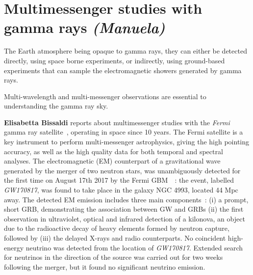 \documentclass{PoS}
\begin{document}
\section{Multimessenger studies with gamma rays {\it (Manuela)}}
The Earth atmosphere being opaque to gamma rays, they can either be  detected directly, using space borne experiments, or indirectly, using ground-based experiments that can sample the electromagnetic showers generated by gamma rays. %


Multi-wavelength and multi-messenger observations are 
essential to understanding the gamma ray sky.


{\bf Elisabetta Bissaldi} reports about multimessenger studies with the \textit{Fermi} gamma ray satellite~\cite{Bissaldi}, operating in space since 10 years. 
The Fermi satellite is a key instrument to perform multi-messenger astrophysics, giving the high pointing accuracy, as well as the high quality data for both temporal and spectral analyses. The  electromagnetic (EM) counterpart of a gravitational wave generated by the merger of two neutron stars, was unambiguously detected for the first time on August 17th 2017 by the Fermi GBM~\cite{Gold2017}~\cite{Abbott2017}: the event, labelled \textit{GW170817}, was found to take place in the galaxy NGC 4993, located 44 Mpc away. The detected EM emission includes three main components~\cite{TheMMpaper}: (i) a prompt, short GRB, demonstrating the association between GW and GRBs (ii) the first observation in ultraviolet, optical and infrared detection of a  kilonova, an object  due to the radioactive decay of heavy elements formed by neutron capture, followed by (iii) the delayed X-rays and radio counterparts. 
No coincident high-energy neutrino was detected  from the location of \textit{GW170817}. Extended search for neutrinos in the direction of the source was carried out for two weeks following the merger, but it found no significant neutrino emission. 
\end{document}
